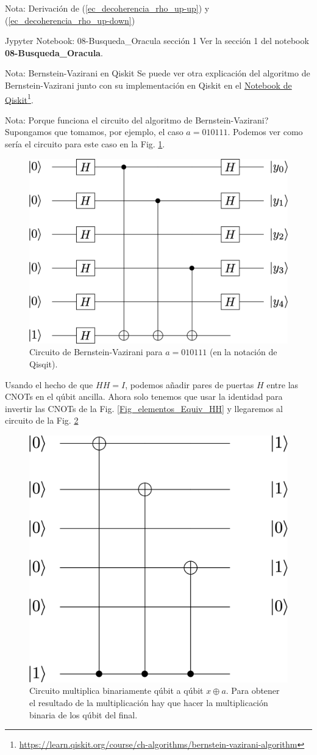 \documentclass[a4paper,11pt]{book} %
\numberwithin{equation}{chapter}
\begin{document}
\begin{mybox_blue}{Nota: Derivación de (\ref{ec_decoherencia_rho_up-up}) y  (\ref{ec_decoherencia_rho_up-down})}
	\begin{mybox_orange}{Jypyter Notebook: 08-Busqueda\_Oracula sección 1}
	Ver la sección 1 del notebook \textbf{08-Busqueda\_Oracula}.
	\end{mybox_orange}

	\begin{mybox_blue}{Nota: Bernstein-Vazirani en Qiskit}
	Se puede ver otra explicación del algoritmo de  Bernstein-Vazirani junto con su implementación en Qiskit en el \href{https://learn.qiskit.org/course/ch-algorithms/bernstein-vazirani-algorithm}{Notebook de Qiskit}\footnote{\url{https://learn.qiskit.org/course/ch-algorithms/bernstein-vazirani-algorithm}}.
	
	\end{mybox_blue}
	
	\begin{mybox_blue}{Nota: Porque funciona el circuito del algoritmo de Bernstein-Vazirani?}
	Supongamos que tomamos, por ejemplo, el caso $a=010111$. Podemos ver como sería el circuito para este caso en la Fig. \ref{Fig_algoritmos_BV_circuit}.
		\begin{figure}[H]
			\centering 
			\includegraphics[width=0.3\linewidth]{Figuras/Fig_algoritmos_BV_circuit.png}
			\caption{Circuito de Bernstein-Vazirani para $a=010111$ (en la notación de Qisqit).}
			\label{Fig_algoritmos_BV_circuit}
			\end{figure}	
	
	Usando el hecho de que $HH=I$, podemos añadir pares de puertas $H$ entre las CNOTs en el qúbit ancilla. Ahora solo tenemos que usar la identidad para invertir las CNOTs
	de la Fig. \ref{Fig_elementos_Equiv_HH} y llegaremos al circuito de la Fig. \ref{Fig_algoritmos_Bernstein_Vazirani_trick}
	
		\begin{figure}[H]
		\centering 
		\includegraphics[width=0.3\linewidth]{Figuras/Fig_algoritmos_Bernstein_Vazirani_trick.png}
		\caption{Circuito multiplica binariamente qúbit a qúbit $x \oplus a$. Para obtener el resultado de la multiplicación hay que hacer la multiplicación binaria de los qúbit del final.}
		\label{Fig_algoritmos_Bernstein_Vazirani_trick}
		\end{figure}
	

\end{mybox_blue}
\end{mybox_blue}
\end{document}
